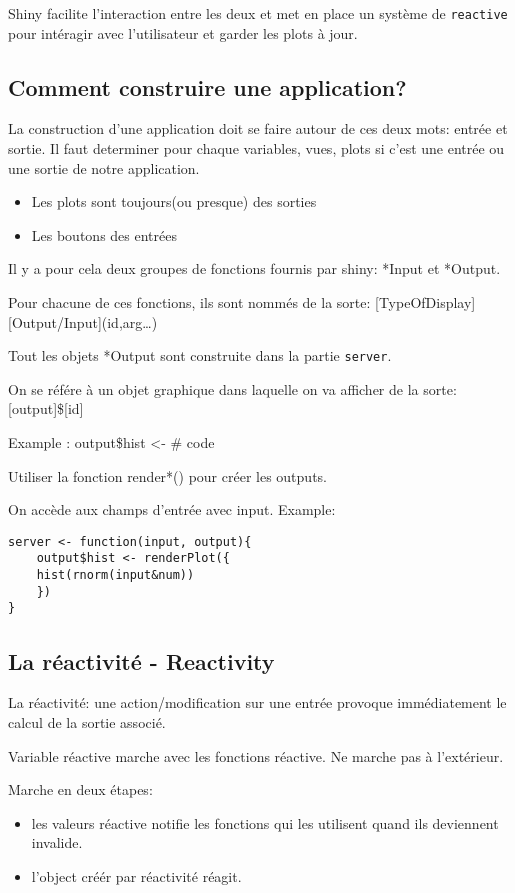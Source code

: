 \documentclass[a4paper]{article}
\begin{document}
Shiny facilite l'interaction entre les deux et met en place un système de \texttt{reactive} pour intéragir avec l'utilisateur et garder les plots à jour.

\subsection{Comment construire une application?}
\label{sec:org18a0e4c}
La construction d'une application doit se faire autour de ces deux mots: entrée et sortie. Il faut determiner pour chaque variables, vues, plots
si c'est une entrée ou une sortie de notre application.

\begin{itemize}
\item Les plots sont toujours(ou presque) des sorties
\item Les boutons des entrées
\end{itemize}

Il y a pour cela deux groupes de fonctions fournis par shiny: *Input et *Output.

Pour chacune de ces fonctions, ils sont nommés de la sorte: [TypeOfDisplay][Output/Input](id,arg\ldots{})

Tout les objets *Output sont construite dans la partie \texttt{server}.

On se référe à un objet graphique dans laquelle on va afficher de la sorte: [output]\$[id]

Example : output\$hist <- \# code

Utiliser la fonction render*() pour créer les outputs.

On accède aux champs d'entrée avec input. Example:

\begin{verbatim}
server <- function(input, output){
    output$hist <- renderPlot({
	hist(rnorm(input&num))
    })
}
\end{verbatim}

\subsection{La réactivité - Reactivity}
\label{sec:org389cc39}
La réactivité: une action/modification sur une entrée provoque immédiatement le calcul de la sortie associé.

Variable réactive marche avec les fonctions réactive. Ne marche pas à l'extérieur.

Marche en deux étapes:
\begin{itemize}
\item les valeurs réactive notifie les fonctions qui les utilisent quand ils deviennent invalide.
\item l'object créér par réactivité réagit.
\end{itemize}
\end{document}
